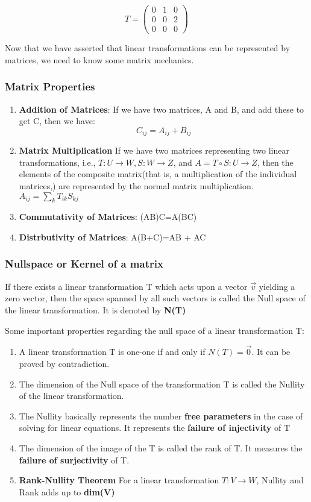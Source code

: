 $$T=\begin{pmatrix}
    0 & 1 & 0\\
    0 & 0 & 2\\
    0 & 0 & 0
\end{pmatrix}
$$

Now that we have asserted that linear transformations can be represented by matrices, we need to know some matrix mechanics. 

\subsubsection{Matrix Properties}

\begin{enumerate}
    \item \textbf{Addition of Matrices}: If we have two matrices, A and B, and add these to get C, then we have:
    $$C_{ij}=A_{ij}+B_{ij}$$
    \item \textbf{Matrix Multiplication}
    If we have two matrices representing two linear transformations, i.e., $T: U\to W, S: W \to Z$, and $A=T \circ S: U \to Z$, then the elements of the composite matrix(that is, a multiplication of the individual matrices,) are represented by the normal matrix multiplication. $A_{ij}=\sum_kT_{ik}S_{kj}$
    \item \textbf{Commutativity of Matrices}: (AB)C=A(BC)
    \item \textbf{Distrbutivity of Matrices}: A(B+C)=AB + AC
\end{enumerate}

\subsubsection{Nullspace or Kernel of a matrix}

If there exists a linear transformation T which acts upon a vector $\vec{v}$ yielding a zero vector, then the space spanned by all such vectors is called the Null space of the linear transformation. It is denoted by \textbf{N(T)}

Some important properties regarding the null space of a linear transformation T:

\begin{enumerate}
    \item A linear transformation T is one-one if and only if $N(T)=\vec{0}$. It can be proved by contradiction.
    \item The dimension of the Null space of the transformation T is called the Nullity of the linear transformation. 
    \item The Nullity basically represents the number \textbf{free parameters} in the case of solving for linear equations. It represents the \textbf{failure of injectivity} of T
    \item The dimension of the image of the T is called the rank of T. It measures the \textbf{failure of surjectivity} of T.
    \item \textbf{Rank-Nullity Theorem} For a linear transformation $T:V\to W$, Nullity and Rank adds up to \textbf{dim(V)}
\end{enumerate}

